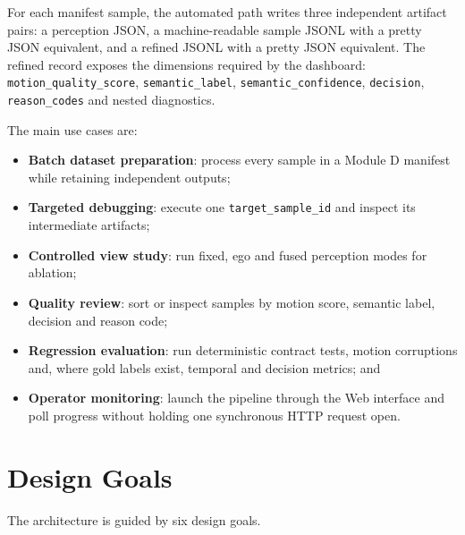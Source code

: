 \documentclass[11pt,oneside]{report}
\begin{document}
For each manifest sample, the automated path writes three independent artifact
pairs: a perception JSON, a machine-readable sample JSONL with a pretty JSON
equivalent, and a refined JSONL with a pretty JSON equivalent. The refined
record exposes the dimensions required by the dashboard:
\texttt{motion\_quality\_score}, \texttt{semantic\_label},
\texttt{semantic\_confidence}, \texttt{decision},
\texttt{reason\_codes} and nested diagnostics.

The main use cases are:

\begin{itemize}
    \item \textbf{Batch dataset preparation}: process every sample in a Module D
    manifest while retaining independent outputs;
    \item \textbf{Targeted debugging}: execute one
    \texttt{target\_sample\_id} and inspect its intermediate artifacts;
    \item \textbf{Controlled view study}: run fixed, ego and fused perception
    modes for ablation;
    \item \textbf{Quality review}: sort or inspect samples by motion score,
    semantic label, decision and reason code;
    \item \textbf{Regression evaluation}: run deterministic contract tests,
    motion corruptions and, where gold labels exist, temporal and decision
    metrics; and
    \item \textbf{Operator monitoring}: launch the pipeline through the Web
    interface and poll progress without holding one synchronous HTTP request
    open.
\end{itemize}

\section{Design Goals}
The architecture is guided by six design goals.
\end{document}
